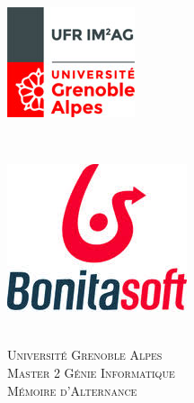 \documentclass[12pt]{article}
\begin{document}
\graphicspath{{images/}}
\begin{titlepage}

\newcommand{\HRule}{\rule{\linewidth}{0.5mm}} %
\setlength{\topmargin}{0in}
\center %


\begin{minipage}{0.4\textwidth}
\begin{flushleft} \large
\hspace*{-0.5cm}
\includegraphics[scale=0.4]{images/imag.jpg}\\
\end{flushleft}
\end{minipage}
~
\begin{minipage}{0.5\textwidth}
\begin{flushright} \large
\hspace*{2cm}
\includegraphics[scale=0.4]{images/company.png}\\
\end{flushright}
\end{minipage}\\[1cm]

\textsc{\LARGE Université Grenoble Alpes}\\[1.5cm]
\textsc{\Large Master 2 Génie Informatique}\\[0.5cm]
\textsc{\large Mémoire d'Alternance}\\[0.5cm]



\end{titlepage}
\end{document}
